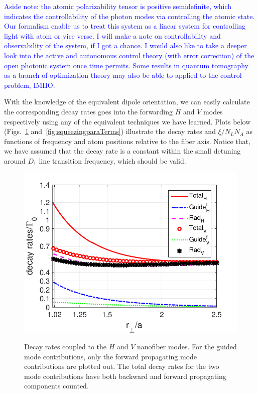 \textcolor{blue}{Aside note: the atomic polarizability tensor is positive semidefinite, which indicates the controllability of the photon modes via controlling the atomic state. Our formalism enable us to treat this system as a linear system for controlling light with atom or vice verse. I will make a note on controllability and observability of the system, if I got a chance. I would also like to take a deeper look into the active and autonomous control theory (with error correction) of the open photonic system once time permits. Some results in quantum tomography as a branch of optimization theory may also be able to applied to the control problem, IMHO. }

With the knowledge of the equivalent dipole orientation, we can easily calculate the corresponding decay rates goes into the forwarding $ H $ and $ V $ modes respectively using any of the equivalent techniques we have learned. Plots below (Figs.~\ref{fig:HVdecayrates} and~\ref{fig:squeezingparaTerms}) illustrate the decay rates and $ \xi/N_LN_A $ as functions of frequency and atom positions relative to the fiber axis. Notice that, we have assumed that the decay rate is a constant within the small detuning around $ D_1 $ line transition frequency, which should be valid. 

\begin{figure}
\begin{minipage}{.91\linewidth}
\centering
{\includegraphics[scale=0.75]{./Figs/HVdecayrates}}
\end{minipage}
\caption{Decay rates coupled to the $ H $ and $ V $ nanofiber modes. For the guided mode contributions, only the forward propagating mode contributions are plotted out. The total decay rates for the two mode contributions have both backward and forward propagating components counted.}\label{fig:HVdecayrates}
\end{figure}

